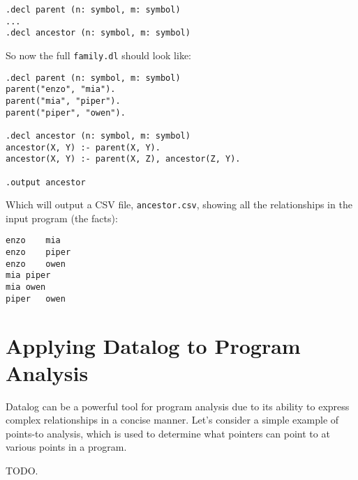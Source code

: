 \documentclass{article}
\theoremstyle{definition}
\begin{document}
\begin{verbatim}
.decl parent (n: symbol, m: symbol)
...
.decl ancestor (n: symbol, m: symbol)
\end{verbatim}

So now the full \texttt{family.dl} should look like:
\begin{verbatim}
.decl parent (n: symbol, m: symbol)
parent("enzo", "mia").
parent("mia", "piper").
parent("piper", "owen").

.decl ancestor (n: symbol, m: symbol)
ancestor(X, Y) :- parent(X, Y).
ancestor(X, Y) :- parent(X, Z), ancestor(Z, Y).

.output ancestor
\end{verbatim}

Which will output a CSV file, \texttt{ancestor.csv}, showing all the relationships in the input program (the facts):
\begin{verbatim}
enzo	mia
enzo	piper
enzo	owen
mia	piper
mia	owen
piper	owen
\end{verbatim}

\section{Applying Datalog to Program Analysis}
Datalog can be a powerful tool for program analysis due to its ability to express complex relationships in a concise manner. Let's consider a simple example of points-to analysis, which is used to determine what pointers can point to at various points in a program.

TODO.
\\
\\
\end{document}
